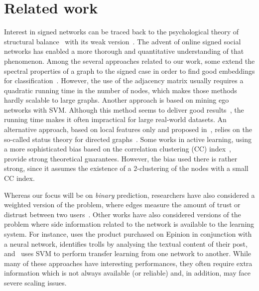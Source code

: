 \section{Related work}
\label{sec:troll_related}

Interest in signed networks can be traced back to the psychological theory of structural
balance~\autocites{Cartwright56}{HeiderBook58} with its weak
version~\autocite{davis1967clustering}.  The advent of online signed social networks has enabled a
more thorough and quantitative understanding of that phenomenon. Among the several approaches
related to our work, some extend the spectral properties of a graph to the signed case in order to
find good embeddings for classification~\autocites{Kunegis2009}{SignedEmbedding15}. However, the
use of the adjacency matrix usually requires a quadratic running time in the number of nodes, which
makes those methods hardly scalable to large graphs. Another approach is based on mining ego
networks with SVM. Although this method seems to deliver good results~\autocite{Papaoikonomou2014},
the running time makes it often impractical for large real-world datasets. An alternative approach,
based on local features only and proposed in~\autocite{Leskovec2010}, relies on the so-called
status theory for directed graphs~\autocite{guha2004propagation}. Some works in active learning,
using a more sophisticated bias based on the correlation clustering (CC)
index~\autocites{Cesa-Bianchi2012a}{Cesa-Bianchi2012b}, provide strong theoretical guarantees.
However, the bias used there is rather strong, since it assumes the existence of a $2$-clustering
of the nodes with a small CC index.

Whereas our focus will be on \emph{binary} prediction, researchers have also considered a weighted
version of the problem, where edges measure the amount of trust or distrust between two
users~\autocites{guha2004propagation}{Tang2013}{Bachi2012}{Qian2014sn}. Other works have also
considered versions of the problem where side information related to the network is available to
the learning system. For instance, \autocite{EdgeSignsRating15} uses the product purchased on
Epinion in conjunction with a neural network, \autocite{TrollDetection15} identifies trolls by
analysing the textual content of their post, and~\autocite{SNTransfer13} uses SVM to perform
transfer learning from one network to another. While many of these approaches have interesting
performances, they often require extra information which is not always available (or reliable) and,
in addition, may face severe scaling issues.

